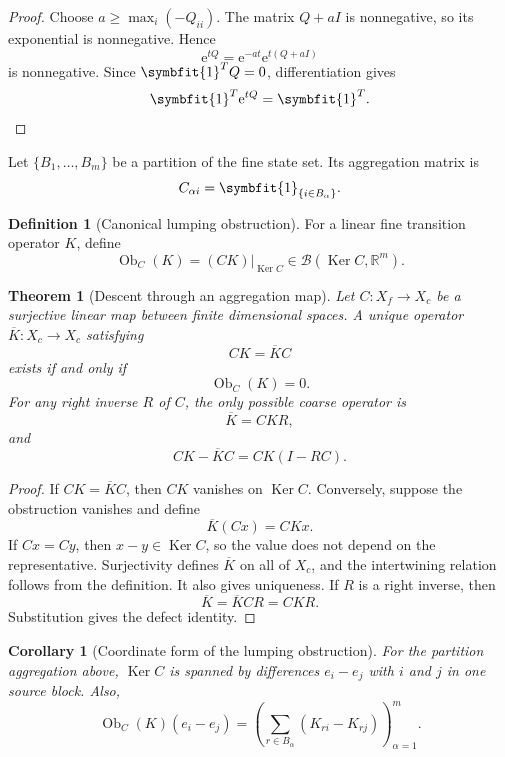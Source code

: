 \documentclass[11pt,letterpaper]{article}
\newtheorem{theorem}{Theorem}[section]
\theoremstyle{plain}
\theoremstyle{plain}
\theoremstyle{plain}
\newtheorem{corollary}[corollary]{Corollary}
\theoremstyle{definition}
\theoremstyle{definition}
\newtheorem{definition}[definition]{Definition}
\theoremstyle{definition}
\theoremstyle{definition}
\theoremstyle{definition}
\theoremstyle{remark}
\theoremstyle{remark}
\theoremstyle{remark}
\theoremstyle{remark}
\theoremstyle{remark}
\newcommand{\Ker}{\operatorname{Ker}}
\theoremstyle{remark}
\newcommand{\RR}{\mathbb R}
\newcommand{\Ob}{\operatorname{Ob}}
\newcommand{\e}{\mathrm e}
\newcommand{\one}{\bm 1}
\providecommand{\bm}[1]{\symbfit{#1}}
\let\KomorebiPrimitiveMathcal\mathcal
\renewcommand{\mathcal}[1]{{\KomorebiPrimitiveMathcal{#1}}}
\let\KomorebiPrimitivemathbb\mathbb
\renewcommand{\mathbb}[1]{{\KomorebiPrimitivemathbb{#1}}}
\let\KomorebiPrimitivemathrm\mathrm
\renewcommand{\mathrm}[1]{{\KomorebiPrimitivemathrm{#1}}}
\begin{document}
\begin{proof}
Choose \(a\geq\max_i(-Q_{ii})\). The matrix \(Q+aI\) is nonnegative, so its exponential is nonnegative. Hence
\[
\e^{tQ}=\e^{-at}\e^{t(Q+aI)}
\]
is nonnegative. Since \(\one^TQ=0\), differentiation gives
\[
\one^T\e^{tQ}=\one^T.
\]
\end{proof}

Let \(\{B_1,\ldots,B_m\}\) be a partition of the fine state set. Its aggregation matrix is
\[
C_{\alpha i}=\one_{\{i\in B_\alpha\}}.
\]

\begin{definition}[Canonical lumping obstruction]\label{extended:record:029}
For a linear fine transition operator \(K\), define
\[
\Ob_C(K)
=
(CK)|_{\Ker C}
\in
\mathcal B(\Ker C,\RR^m).
\]
\end{definition}

\begin{theorem}[Descent through an aggregation map]\label{extended:record:030}\label{extended:thm:canonical_lumping_obstruction}
Let \(C:X_f\to X_c\) be a surjective linear map between finite dimensional spaces. A unique operator \(\overline K:X_c\to X_c\) satisfying
\[
CK=\overline KC
\]
exists if and only if
\[
\Ob_C(K)=0.
\]
For any right inverse \(R\) of \(C\), the only possible coarse operator is
\[
\overline K=CKR,
\]
and
\[
CK-\overline KC
=
CK(I-RC).
\]
\end{theorem}

\begin{proof}
If \(CK=\overline KC\), then \(CK\) vanishes on \(\Ker C\). Conversely, suppose the obstruction vanishes and define
\[
\overline K(Cx)=CKx.
\]
If \(Cx=Cy\), then \(x-y\in\Ker C\), so the value does not depend on the representative. Surjectivity defines \(\overline K\) on all of \(X_c\), and the intertwining relation follows from the definition. It also gives uniqueness. If \(R\) is a right inverse, then
\[
\overline K=\overline KCR=CKR.
\]
Substitution gives the defect identity.
\end{proof}

\begin{corollary}[Coordinate form of the lumping obstruction]\label{extended:record:031}\label{extended:cor:lumping_obstruction_coordinates}
For the partition aggregation above, \(\Ker C\) is spanned by differences \(e_i-e_j\) with \(i\) and \(j\) in one source block. Also,
\[
\Ob_C(K)(e_i-e_j)
=
\left(
\sum_{r\in B_\alpha}(K_{ri}-K_{rj})
\right)_{\alpha=1}^m.
\]
\end{corollary}
\end{document}
